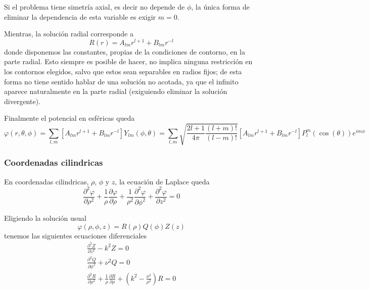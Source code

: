 \documentclass[a4paper]{article}
\numberwithin{equation}{section} %
\begin{document}
Si el problema tiene simetría axial, es decir no depende de $\phi$, la única forma de eliminar la dependencia de esta variable es exigir $m = 0$. 

Mientras, la solución radial corresponde a
\begin{equation}
R(r) = A_{l m} r^{l + 1} + B_{l m} r^{-l}
\end{equation}
donde disponemos las constantes, propias de la condiciones de contorno, en la parte radial. Esto siempre es posible de hacer, no implica ninguna restricción en los contornos elegidos, salvo que estos sean separables en radios fijos; de esta forma no tiene sentido hablar de una solución no acotada, ya que el infinito aparece naturalmente en la parte radial (exiguiendo eliminar la solución divergente).

Finalmente el potencial en esféricas queda
\begin{equation}
\varphi(r, \theta, \phi) = \sum_{l, m} [A_{l m} r^{l + 1} + B_{l m} r^{-l}] Y_{l m}(\phi, \theta) =  \sum_{l, m} \sqrt{\frac{2l + 1}{4\pi} \frac{(l + m)!}{(l - m)!}}  [A_{l m} r^{l + 1} + B_{l m} r^{-l}] P^{m}_l(\cos(\theta)) e^{i m \phi}
\end{equation}

\subsubsection{Coordenadas cilindricas}
En coordenadas cilindricas, $\rho$, $\phi$ y $z$, la ecuación de Laplace queda
\begin{equation}
	\frac{\partial^2 \varphi}{\partial \rho^2} + \frac{1}{\rho} \frac{\partial \varphi}{\partial \rho} + \frac{1}{\rho^2} \frac{\partial^2 \varphi}{\partial \phi^2} + \frac{\partial^2 \varphi}{\partial z^2} = 0
	\label{eq:electroestatica_separacion_cilindricas_laplace}
\end{equation}

Eligiendo la solución usual
\begin{equation}
	\varphi(\rho, \phi, z) = R(\rho) Q(\phi) Z(z)
\end{equation}
tenemos las siguientes ecuaciones diferenciales
\begin{equation}
	\begin{gathered}
		\frac{\partial^2 Z}{\partial z^2} - k^2 Z = 0 \\
		\frac{\partial^2 Q}{\partial \phi^2} + \nu^2 Q = 0 \\
		\frac{\partial^2 R}{\partial \rho^2} + \frac{1}{\rho} \frac{\partial R}{\partial \rho} + \left(k^2 - \frac{\nu^2}{\rho^2} \right) R = 0
	\end{gathered}
\end{equation}
\end{document}
